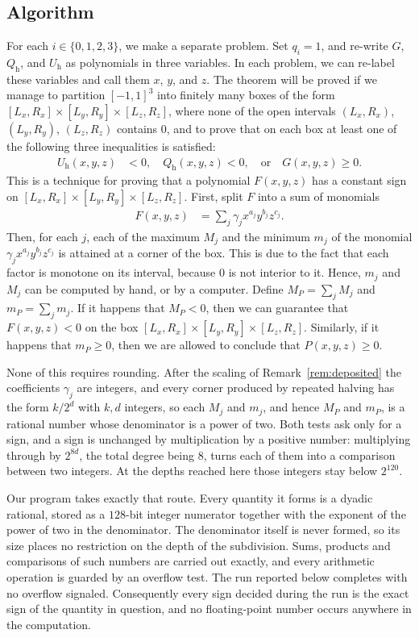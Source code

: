 \documentclass[reqno]{amsart}
\theoremstyle{definition}
\begin{document}
\subsection{Algorithm}
For each $i\in\{0,1,2,3\}$, we make a separate problem. Set $q_i=1$, and re-write
$G$, $Q_{\mathrm h}$, and $U_{\mathrm h}$ as polynomials in three variables. In each problem, we can re-label these variables and call them
$x$, $y$, and $z$. The theorem will be proved if
we manage to partition $[-1,1]^3$ into finitely many boxes of the form $[L_x,R_x]\times[L_y,R_y]\times [L_z,R_z]$, where none of the open intervals
$(L_x,R_x)$, $(L_y,R_y)$, $(L_z,R_z)$ contains $0$, and to prove that on each box at least
one of the following three inequalities is satisfied:
\begin{align}
U_{\mathrm h}(x,y,z)&< 0,\quad Q_{\mathrm h}(x,y,z)<0,\quad\text{or}\quad G(x,y,z)\geq 0.
\label{eqn:threeInequalities}
\end{align}
This is a technique for proving that a polynomial $F(x,y,z)$ has a constant sign on $[L_x,R_x]\times[L_y,R_y]\times [L_z,R_z]$.
 First, split $F$ into a sum of monomials \begin{align*}F(x,y,z)&=\sum_j \gamma_j x^{a_j}y^{b_j}z^{c_j}.
\end{align*}
Then, for each $j$, each of the maximum $M_j$ and the minimum $m_j$ of the monomial $\gamma_jx^{a_j}y^{b_j}z^{c_j}$ is attained at a corner of the box. This is due to the fact that each factor is monotone on its interval, because $0$ is not interior to it. Hence, $m_j$ and $M_j$ can be computed by hand, or by a computer. Define $M_P=\sum_jM_j$ and $m_P=\sum_jm_j$. If it happens that $M_P<0$, then we can guarantee that $F(x,y,z)<0$ on the box $[L_x,R_x]\times[L_y,R_y]\times [L_z,R_z]$. Similarly, if it happens that
$m_P\geq 0$, then we are allowed to conclude that $P(x,y,z)\geq 0$.

None of this requires rounding. After the scaling of Remark~\ref{rem:deposited} the coefficients
$\gamma_j$ are integers, and every corner produced by repeated halving has the form $k/2^{d}$ with
$k,d$ integers, so each $M_j$ and $m_j$, and hence $M_P$ and $m_P$, is a rational number whose
denominator is a power of two. Both tests ask only for a sign, and a sign is unchanged by
multiplication by a positive number: multiplying through by $2^{8d}$, the total degree being $8$,
turns each of them into a comparison between two integers. At the depths reached here those
integers stay below $2^{120}$.

Our program takes exactly that route. Every quantity it forms is a dyadic rational,
stored as a $128$-bit integer numerator together with the exponent of the power of two in the
denominator. The denominator itself is never formed, so its size places no restriction on the depth
of the subdivision. Sums, products and comparisons of such numbers are carried out exactly, and
every arithmetic operation is guarded by an overflow test. The run reported below completes with no
overflow signaled. Consequently every sign decided during the run is the exact sign of the
quantity in question, and no floating-point number occurs anywhere in the computation.
\end{document}
